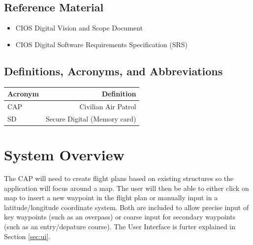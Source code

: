\documentclass[12pt, letterpaper]{article}
\begin{document}
  \subsection{Reference Material}
    \begin{itemize}
      \setlength{\itemsep}{1pt}
      \setlength{\parskip}{0pt}
      \setlength{\parsep}{0pt}
      \item CIOS Digital Vision and Scope Document
      \item CIOS Digital Software Requirements Specification (SRS)
    \end{itemize}

  \subsection{Definitions, Acronyms, and Abbreviations}
  	\begin{tabularx}{\textwidth}{|l|R|} \hline
    	Acronym & Definition \\ \hline
    	CAP & Civilian Air Patrol  \\ \hline
    	SD & Secure Digital (Memory card) \\ \hline
  	\end{tabularx}

  \section{System Overview}\label{system}
    The CAP will need to create flight plans based on existing structures so the application will focus around a map.
    The user will then be able to either click on map to insert a new waypoint in the flight plan or manually input in a latitude/longitude coordinate system.
    Both are included to allow precise input of key waypoints (such as an overpass) or coarse input for secondary waypoints (such as an entry/depature course).
    The User Interface is furter explained in Section \ref{sec:ui}.
\end{document}
